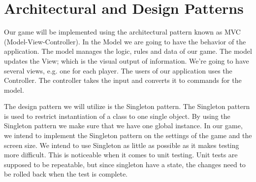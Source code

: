 \chapter{Architectural and Design Patterns}
Our game will be implemented using the architectural pattern known as MVC (Model-View-Controller). In the Model we are going to have the behavior of the application. The model manages the logic, rules and data of our game. The model updates the View; which is the visual output of information. We’re going to have several views, e.g. one for each player. The users of our application uses the Controller. The controller takes the input and converts it to commands for the model.


The design pattern we will utilize is the Singleton pattern. The Singleton pattern is used to restrict instantiation of a class to one single object. By using the Singleton pattern we make sure that we have one global instance. In our game, we intend to implement the Singleton pattern on the settings of the game and the screen size. We intend to use Singleton as little as possible as it makes testing more difficult. This is noticeable when it comes to unit testing. Unit tests are supposed to be repeatable, but since singleton have a state, the changes need to be rolled back when the test is complete. 
